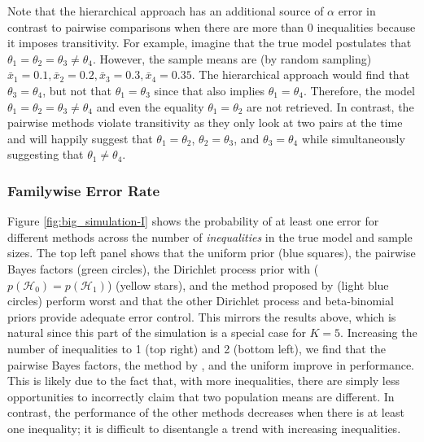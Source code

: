 \documentclass[11pt,a4paper]{article}
\theoremstyle{definition} %
\theoremstyle{case}
\newcommand{\FD}[1]{\textcolor{red}{Fabian: #1 }}
\begin{document}
Note that the hierarchical approach has an additional source of $\alpha$ error in contrast to pairwise comparisons when there are more than 0 inequalities because it imposes transitivity. For example, imagine that the true model postulates that $\theta_1 = \theta_2 = \theta_3 \neq \theta_4$. However, the sample means are (by random sampling) $\bar{x}_1 = 0.1, \bar{x}_2 = 0.2, \bar{x}_3 = 0.3, \bar{x}_4 = 0.35$. The hierarchical approach would find that $\theta_3 = \theta_4$, but not that $\theta_1 = \theta_3$ since that also implies $\theta_1 = \theta_4$. Therefore, the model $\theta_1 = \theta_2 = \theta_3 \neq \theta_4$ and even the equality $\theta_1 = \theta_2$ are not retrieved. In contrast, the pairwise methods violate transitivity as they only look at two pairs at the time and will happily suggest that $\theta_1 = \theta_2$, $\theta_2 = \theta_3$, and $\theta_3 = \theta_4$ while simultaneously suggesting that $\theta_1 \neq \theta_4$.


\subsubsection{Familywise Error Rate} \label{sec:simulation-family}
Figure \ref{fig:big_simulation-I} shows the probability of at least one error for different methods across the number of \textit{inequalities} in the true model and sample sizes. The top left panel shows that the uniform prior (blue squares), the pairwise Bayes factors (green circles), the Dirichlet process prior with ($p(\mathcal{H}_0) = p(\mathcal{H}_1)$) (yellow stars), and the method proposed by \textcite{westfall1997bayesian} (light blue circles) perform worst and that the other Dirichlet process and beta-binomial priors provide adequate error control. This mirrors the results above, which is natural since this part of the simulation is a special case for $K = 5$. Increasing the number of inequalities to 1 (top right) and 2 (bottom left), we find that the pairwise Bayes factors, the method by \textcite{westfall1997bayesian}, and the uniform improve in performance. This is likely due to the fact that, with more inequalities, there are simply less opportunities to incorrectly claim that two population means are different. In contrast, the performance of the other methods decreases when there is at least one inequality; it is difficult to disentangle a trend with increasing inequalities.
\end{document}
